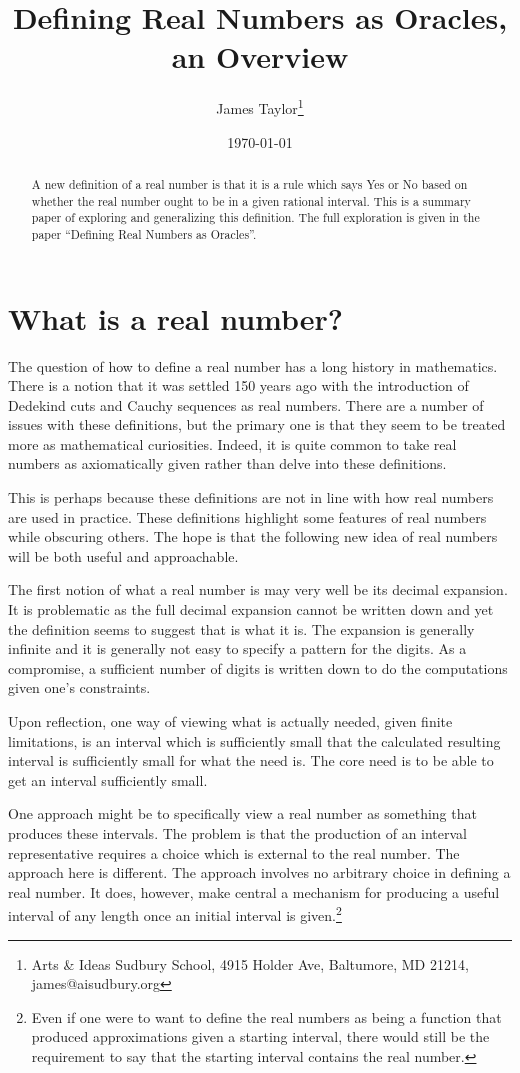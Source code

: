 \documentclass[12pt]{article}
\title{Defining Real Numbers as Oracles, an Overview}
\author{
  James Taylor\footnote{Arts \& Ideas Sudbury School, 4915 Holder Ave, Baltumore, MD 21214, james@aisudbury.org}
}
\date{\today}
\theoremstyle{remark}
\begin{document}
\maketitle
\begin{abstract}
A new definition of a real number is that it is a rule which says Yes or No based on whether the real number ought to be in a given rational interval. This is a summary paper of exploring and generalizing this definition. The full exploration is given in the paper ``Defining Real Numbers as Oracles''. 
\end{abstract}


\section{What is a real number?}

The question of how to define a real number has a long history in mathematics. There is a notion that it was settled 150 years ago with the introduction of Dedekind cuts and Cauchy sequences as real numbers. There are a number of issues with these definitions, but the primary one is that they seem to be treated more as mathematical curiosities. Indeed, it is quite common to take real numbers as axiomatically given rather than delve into these definitions. 

This is perhaps because these definitions are not in line with how real numbers are used in practice. These definitions highlight some features of real numbers while obscuring others. The hope is that the following new idea of real numbers will be both useful and approachable. 

The first notion of what a real number is may very well be its decimal expansion. It is problematic as the full decimal expansion cannot be written down and yet the definition seems to suggest that is what it is. The expansion is generally infinite and it is generally not easy to specify a pattern for the digits. As a compromise, a sufficient number of digits is written down to do the computations given one's constraints.  

Upon reflection, one way of viewing what is actually needed, given finite limitations, is an interval which is sufficiently small that the calculated resulting interval is sufficiently small for what the need is. The core need is to be able to get an interval sufficiently small. 

One approach might be to specifically view a real number as something that produces these intervals. The problem is that the production of an interval representative requires a choice which is external to the real number. The approach here is different. The approach involves no arbitrary choice in defining a real number. It does, however, make central a mechanism for producing a useful interval of any length once an initial interval is given.\footnote{Even if one were to want to define the real numbers as being a function that produced approximations given a starting interval, there would still be the requirement to say that the starting interval contains the real number.}
\end{document}
